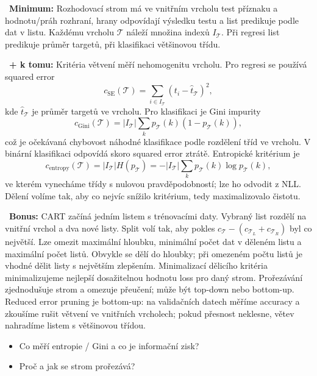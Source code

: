 \begin{odpoved}
\setlength{\parskip}{2pt}
\noindent{}\ \textbf{Minimum:} Rozhodovací strom má ve vnitřním vrcholu test příznaku a hodnotu/práh rozhraní, hrany odpovídají výsledku testu a list predikuje podle dat v listu. Každému vrcholu $\mathcal T$ náleží množina indexů $I_\mathcal T$. Při regresi list predikuje průměr targetů, při klasifikaci většinovou třídu.\par
\noindent{}\ \textbf{+ k tomu:} Kritéria větvení měří nehomogenitu vrcholu. Pro regresi se používá squared error
\[
c_{\mathrm{SE}}(\mathcal T)=
\sum_{i\in I_\mathcal T}(t_i-\hat t_\mathcal T)^2,
\]
kde $\hat t_\mathcal T$ je průměr targetů ve vrcholu. Pro klasifikaci je Gini impurity
\[
c_{\mathrm{Gini}}(\mathcal T)=
|I_\mathcal T|\sum_k p_\mathcal T(k)(1-p_\mathcal T(k)),
\]
což je očekávaná chybovost náhodné klasifikace podle rozdělení tříd ve vrcholu. V binární klasifikaci odpovídá skoro squared error ztrátě. Entropické kritérium je
\[
c_{\mathrm{entropy}}(\mathcal T)
=|I_\mathcal T|H(p_\mathcal T)
=-|I_\mathcal T|\sum_k p_\mathcal T(k)\log p_\mathcal T(k),
\]
ve kterém vynecháme třídy s nulovou pravděpodobností; lze ho odvodit z NLL. Dělení volíme tak, aby co nejvíc snížilo kritérium, tedy maximalizovalo čistotu.\par
\noindent{}\ \textbf{Bonus:} CART začíná jedním listem s trénovacími daty. Vybraný list rozdělí na vnitřní vrchol a dva nové listy. Split volí tak, aby pokles $c_\mathcal T-(c_{\mathcal T_L}+c_{\mathcal T_R})$ byl co největší. Lze omezit maximální hloubku, minimální počet dat v děleném listu a maximální počet listů. Obvykle se dělí do hloubky; při omezeném počtu listů je vhodné dělit listy s největším zlepšením. Minimalizací dělicího kritéria minimalizujeme nejlepší dosažitelnou hodnotu loss pro daný strom.
Prořezávání zjednodušuje strom a omezuje přeučení; může být top-down nebo bottom-up. Reduced error pruning je bottom-up: na validačních datech měříme accuracy a zkoušíme rušit větvení ve vnitřních vrcholech; pokud přesnost neklesne, větev nahradíme listem s většinovou třídou.
\end{odpoved}
\begin{recall}
\begin{itemize}[leftmargin=1.2em,itemsep=0pt,topsep=1pt]
  \item Co měří entropie / Gini a co je informační zisk?
  \item Proč a jak se strom prořezává?
\end{itemize}
\end{recall}

